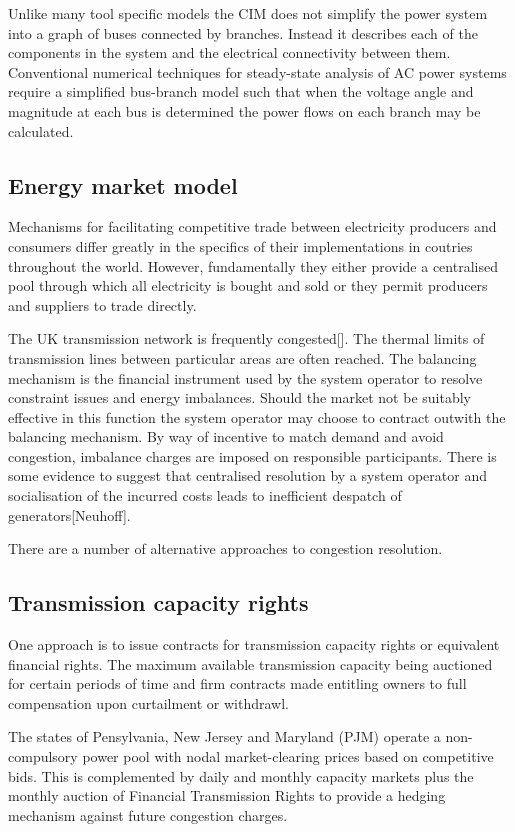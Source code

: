 Unlike many tool specific models the CIM does not simplify the power system
into a graph of buses connected by branches.  Instead it describes each of the
components in the system and the electrical connectivity between them.
Conventional numerical techniques for steady-state analysis of AC power
systems require a simplified bus-branch model such that when the voltage angle
and magnitude at each bus is determined the power flows on each branch may be
calculated.


\subsection{Energy market model}
Mechanisms for facilitating competitive trade between electricity producers and
consumers differ greatly in the specifics of their implementations in coutries
throughout the world.  However, fundamentally they either provide a
centralised pool through which all electricity is bought and sold or they
permit producers and suppliers to trade directly.

The UK transmission network is frequently congested[].  The thermal limits of
transmission lines between particular areas are often reached.  The balancing
mechanism is the financial instrument used by the system operator to resolve
constraint issues and energy imbalances.  Should the market not be suitably
effective in this function the system operator may choose to contract outwith
the balancing mechanism.  By way of incentive to match demand and avoid
congestion, imbalance charges are imposed on responsible participants.  There
is some evidence to suggest that centralised resolution by a system operator
and socialisation of the incurred costs leads to inefficient despatch of
generators[Neuhoff].

There are a number of alternative approaches to congestion
resolution.

\subsection{Transmission capacity rights}
One approach is to issue contracts for transmission capacity rights or
equivalent financial rights.  The maximum available transmission capacity
being auctioned for certain periods of time and firm contracts made entitling
owners to full compensation upon curtailment or
withdrawl.

The states of Pensylvania, New Jersey and Maryland (PJM) operate a
non-compulsory power pool with nodal market-clearing prices based on
competitive bids.  This is complemented by daily and monthly capacity markets
plus the monthly auction of Financial Transmission Rights to provide a hedging
mechanism against future congestion charges.


